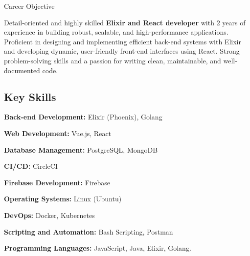 \documentclass{resume} %
\begin{document}


\begin{rSection}{Career Objective}

    {Detail-oriented and highly skilled \textbf{Elixir and React developer} with 2 years of experience in building robust, scalable, and high-performance applications. Proficient in designing and implementing efficient back-end systems with Elixir and developing dynamic, user-friendly front-end interfaces using React. Strong problem-solving skills and a passion for writing clean, maintainable, and well-documented code.}


    
\subsection*{Key Skills}

 \hspace{5mm} \textbf{Back-end Development:} Elixir (Phoenix), Golang

 \hspace{5mm} \textbf{Web Development:} Vue.js, React

 \hspace{5mm} \textbf{Database Management:} PostgreSQL, MongoDB

 \hspace{5mm} \textbf{CI/CD:} CircleCI

 \hspace{5mm} \textbf{Firebase Development:} Firebase

 \hspace{5mm} \textbf{Operating Systems:} Linux (Ubuntu)

 \hspace{5mm} \textbf{DevOps:} Docker, Kubernetes

 \hspace{5mm} \textbf{Scripting and Automation:} Bash Scripting, Postman


 \hspace{5mm} \textbf{Programming Languages:} JavaScript, Java, Elixir, Golang.

\end{rSection}
\end{document}
